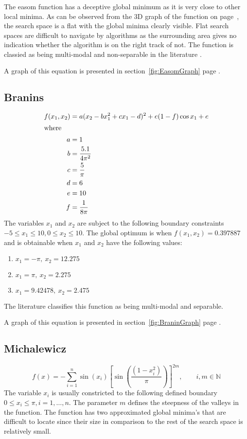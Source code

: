 The easom function has a deceptive global minimum as it is very close to other local minima\cite{ABCCompareStudy,TSGlobalOptimization}. As can be observed from the 3D graph of the function on page~\pageref{fig:EasomGraph}, the search space is a flat with the global minima clearly visible. Flat search spaces are difficult to navigate by algorithms as the surrounding area gives no indication whether the algorithm is on the right track of not. The function is classied as being multi-modal and non-separable in the literature \cite{ABCCompareStudy,TSGlobalOptimization,TSGlobalOptContinFunc}.

A graph of this equation is presented in section~\ref{fig:EasomGraph} page \pageref{fig:EasomGraph}.
\subsection{Branins}
\begin{align}
	f(x_1,x_2) &= a(x_2 - bx_1^2 + cx_1 - d)^2 + e(1-f)\cos{x_1} + e \\
\intertext{where}
	a &= 1\nonumber\\
	b &= \frac{5.1}{4\pi^2}\nonumber\\
	c &= \frac{5}{\pi}\nonumber\\
	d &= 6\nonumber\\
	e &= 10\nonumber\\
	f &= \frac{1}{8\pi}\nonumber
\end{align}
The variables $x_1$ and $x_2$ are subject to the following boundary constraints $-5\leq x_1 \leq 10, 0 \leq x_2 \leq 10$\cite{ABCCompareStudy,TSGlobalOptimization,ContinACSTS,TestFunctions}. The global optimum is when $f(x_1,x_2) = 0.397887$ and is obtainable when $x_1$ and $x_2$ have the following values\cite{ABCCompareStudy,TSGlobalOptimization,ContinACSTS,TestFunctions}:
\begin{enumerate}
\item $x_1 = -\pi,\:x_2=12.275$
\item $x_1 = \pi,\:x_2=2.275$
\item $x_1 = 9.42478,\:x_2=2.475$
\end{enumerate}
The literature classifies this function as being multi-modal and separable\cite{ABCCompareStudy,TSGlobalOptimization,ContinACSTS,TestFunctions}.

A graph of this equation is presented in section~\ref{fig:BraninGraph} page \pageref{fig:BraninGraph}.
\subsection{Michalewicz}
\begin{equation}
	f(x) = -\sum_{i=1}^n\sin{(x_i)}[\sin{(\frac{(1 - x_i^2)}{\pi})}]^{2m}, \qquad i,m \in \mathbb{N}
\end{equation}
The variable $x_i$ is usually constricted to the following defined boundary $0 \leq x_i \leq \pi, i = 1,\ldots,n$\cite{ABCCompareStudy,TestFunctions}. The parameter $m$ defines the steepness of the valleys in the function. The function has two approximated global minima's that are difficult to locate since their size in comparison to the rest of the search space is relatively small\cite{ABCCompareStudy,TestFunctions}.

